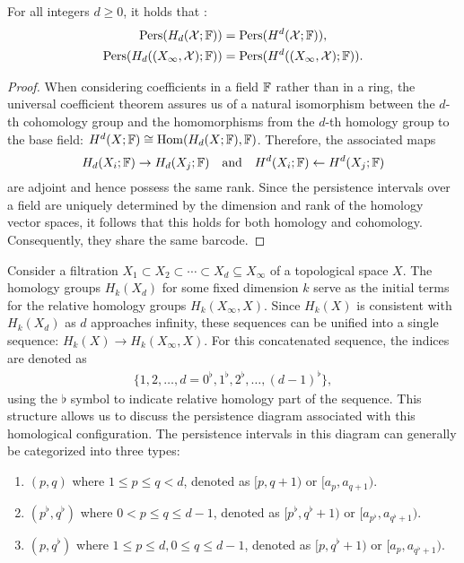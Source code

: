 \begin{theorem}
For all integers $d \geq 0$, it holds that \cite[Proposition 2.3]{de2011dualities}:
\begin{align}
\mathrm{Pers}(H_{d}(\mathcal{X};{\mathbb{F}})) &= \mathrm{Pers}(H^{d}(\mathcal{X};{\mathbb{F}})), \\
\mathrm{Pers}(H_{d}((X_{\infty}, \mathcal{X});{\mathbb{F}})) &= \mathrm{Pers}(H^{d}((X_{\infty}, \mathcal{X});{\mathbb{F}})).
\end{align}
\end{theorem}

\begin{proof}
When considering coefficients in a field ${\mathbb{F}}$ rather than in a ring, the universal coefficient theorem assures us of a natural isomorphism between the $d$-th cohomology group and the homomorphisms from the $d$-th homology group to the base field: $H^{d}(X; {\mathbb{F}}) \cong \operatorname{Hom}(H_{d}(X; {\mathbb{F}}), {\mathbb{F}})$. Therefore, the associated maps
\begin{equation}
H_{d}(X_{i}; {\mathbb{F}}) \rightarrow H_{d}(X_{j}; {\mathbb{F}}) \quad \text{and} \quad H^{d}(X_{i}; {\mathbb{F}}) \leftarrow H^{d}(X_{j}; {\mathbb{F}})
\end{equation}
are adjoint and hence possess the same rank. Since the persistence intervals over a field are uniquely determined by the dimension and rank of the homology vector spaces, it follows that this holds for both homology and cohomology. Consequently, they share the same barcode.
\end{proof}

Consider a filtration $X_{1} \subset X_{2} \subset \cdots \subset X_d \subseteq X_{\infty}$ of a topological space $X$. The homology groups $H_{k}(X_{d})$ for some fixed dimension $k$ serve as the initial terms for the relative homology groups $H_{k}(X_{\infty}, X)$. Since $H_{k}(X)$ is consistent with $H_{k}(X_{d})$ as $d$ approaches infinity, these sequences can be unified into a single sequence: $H_{k}(X) \to H_{k}(X_{\infty}, X)$. For this concatenated sequence, the indices are denoted as
\begin{align}
\{1, 2, \ldots, d = 0^{\flat}, 1^{\flat}, 2^{\flat}, \ldots, (d-1)^{\flat}\},
\end{align}
using the $\flat$ symbol to indicate relative homology part of the sequence. This structure allows us to discuss the persistence diagram associated with this homological configuration. The persistence intervals in this diagram can generally be categorized into three types:
\begin{enumerate}
	\item $(p, q)$ where $1 \leq p \leq q < d$, denoted as $[p, q+1)$ or $[a_{p}, a_{q+1})$.
	\item $(p^{\flat}, q^{\flat})$ where $0 < p \leq q \leq d-1$, denoted as $[p^{\flat}, q^{\flat}+1)$ or $[a_{p^\flat}, a_{q^\flat+1})$.
	\item $(p, q^{\flat})$ where $1 \leq p \leq d, 0 \leq q \leq d-1$, denoted as $[p, q^{\flat}+1)$ or $[a_{p}, a_{q^\flat+1})$.
\end{enumerate}

